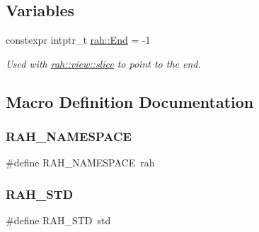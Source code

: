 \subsection*{Variables}
\begin{DoxyCompactItemize}
\item 
constexpr intptr\+\_\+t \mbox{\hyperlink{namespacerah_a5af06eebbd592c36368022990839b982}{rah\+::\+End}} = -\/1
\begin{DoxyCompactList}\small\item\em Used with \mbox{\hyperlink{namespacerah_1_1view_a419374b95b3b9601655b0edf753963c3}{rah\+::view\+::slice}} to point to the end. \end{DoxyCompactList}\end{DoxyCompactItemize}


\subsection{Macro Definition Documentation}
\mbox{\label{rah_01-_01_copie_8hpp_ad3a388e89994ad75cbafb263072ddfbc}} 
\subsubsection{\texorpdfstring{RAH\_NAMESPACE}{RAH\_NAMESPACE}}
{\footnotesize\ttfamily \#define R\+A\+H\+\_\+\+N\+A\+M\+E\+S\+P\+A\+CE~rah}

\mbox{\label{rah_01-_01_copie_8hpp_aeff36e7cf7306f349f17e936ad105e53}} 
\subsubsection{\texorpdfstring{RAH\_STD}{RAH\_STD}}
{\footnotesize\ttfamily \#define R\+A\+H\+\_\+\+S\+TD~std}

